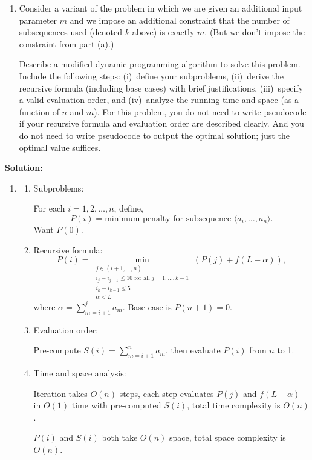 \documentclass[11pt]{article}
\begin{document}
\begin{description}
\begin{enumerate}
\medskip
\item[(b)]  Consider a variant of the problem in which we are given an additional input parameter $m$ and we impose an additional constraint that the number of subsequences used (denoted $k$ above) is exactly $m$.  (But we don't impose the constraint from part (a).)

Describe a modified dynamic programming algorithm to solve
this problem.  
Include
the following steps: (i)~define your subproblems, (ii)~derive the recursive formula (including base cases) with
brief justifications, (iii)~specify a valid evaluation order, and
(iv)~analyze the running time and space (as a function of $n$ and $m$).
For this problem, you do not need to write pseudocode if your recursive formula and evaluation order are described clearly.
And you do not need to write pseudocode to 
output the optimal solution; just the optimal value suffices.
\end{enumerate}

\textbf{Solution:}
\begin{enumerate}
\item[(a)]
  \begin{enumerate}
    \item[(i)] Subproblems:
    
    For each $i = 1, 2, \ldots, n$, define,
    \[
      P(i) = \text{minimum penalty for subsequence } \langle a_i,\ldots,a_n\rangle.
    \]
    Want $P(0)$.

    \item[(ii)] Recursive formula:
    \[
      P(i) = \min_{\substack{j \in (i+1,\ldots,n) \\ 
      i_j-i_{j-1}\le 10 \text{ for all } j=1,\ldots,k-1 \\ 
      i_k-i_{k-1}\le 5 \\ \alpha < L}}(P(j) + f(L - \alpha)),
    \]
    where $\alpha = \sum_{m=i+1}^{j}a_m$. Base case is $P(n+1) = 0$.

    \item[(iii)] Evaluation order:

    Pre-compute $S(i) = \sum_{m=i+1}^{n}a_m$, then evaluate $P(i)$ from $n$ to 1.

    \item[(iv)] Time and space analysis:
    
    Iteration takes $O(n)$ steps, each step evaluates $P(j)$ and $f(L - \alpha)$ in 
    $O(1)$ time with pre-computed $S(i)$, total time complexity is $O(n)$.

    $P(i)$ and $S(i)$ both take $O(n)$ space, total space complexity is $O(n)$.
  \end{enumerate}


\end{enumerate}
\end{description}
\end{document}
